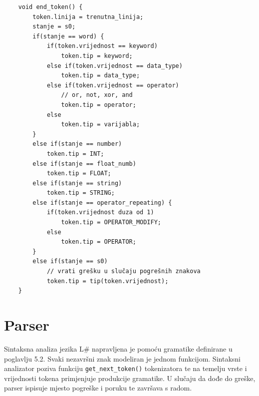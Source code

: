 \documentclass[times, utf8, zavrsni]{fer}
\begin{document}
\begin{verbatim}
    void end_token() {
        token.linija = trenutna_linija;
        stanje = s0;
        if(stanje == word) {
            if(token.vrijednost == keyword)
                token.tip = keyword;
            else if(token.vrijednost == data_type)
                token.tip = data_type;
            else if(token.vrijednost == operator)
                // or, not, xor, and
                token.tip = operator;
            else
                token.tip = varijabla;
        }
        else if(stanje == number)
            token.tip = INT;
        else if(stanje == float_numb)
            token.tip = FLOAT;
        else if(stanje == string)
            token.tip = STRING;
        else if(stanje == operator_repeating) {
            if(token.vrijednost duza od 1)
                token.tip = OPERATOR_MODIFY;
            else
                token.tip = OPERATOR;
        }
        else if(stanje == s0)
            // vrati grešku u slučaju pogrešnih znakova
            token.tip = tip(token.vrijednost);
    }
\end{verbatim}

\section{Parser}
Sintaksna analiza jezika L\# napravljena je pomoću gramatike definirane u poglavlju 5.2. Svaki nezavršni znak modeliran je jednom funkcijom.
Sintaksni analizator poziva funkciju \verb|get_next_token()| tokenizatora te na temelju vrste i vrijednosti tokena primjenjuje produkcije gramatike.
U slučaju da dođe do greške, parser ispisuje mjesto pogreške i poruku te završava s radom.
\end{document}
